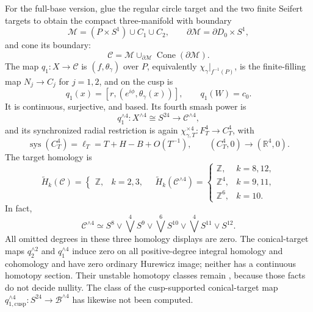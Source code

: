 \begin{enumerate}[leftmargin=1.8em,itemsep=.65em]
For the full-base version, glue the regular circle target and the two finite
Seifert targets to obtain the compact three-manifold with boundary
\[
 \mathcal M=(P\times S^1)\cup C_1\cup C_2,
 \qquad \partial\mathcal M=\partial D_0\times S^1,
\]
and cone its boundary:
\[
 \mathcal C=\mathcal M\cup_{\partial\mathcal M}
 \operatorname{Cone}(\partial\mathcal M).
\]
The map \(q_1:X\to\mathcal C\) is \((f,\theta_\gamma)\) over \(P\),
equivalently \(\chi_\gamma|_{f^{-1}(P)}\), is the
finite-filling map \(N_j\to C_j\) for \(j=1,2\), and on the cusp is
\[
 q_1(x)=[r,(e^{i\phi},\theta_\gamma(x))],\qquad q_1(W)=c_0.
\]
It is continuous, surjective, and based.  Its fourth smash power is
\[
 q_1^{\wedge4}:X^{\wedge4}\cong S^{24}\longrightarrow\mathcal C^{\wedge4},
\]
and its synchronized radial restriction is again
\(\chi_{\gamma,T}^{\times4}:F_T^4\to C_T^4\), with
\[
 \operatorname{sys}(C_T^4)=\ell_T=T+H-B+O(T^{-1}),
 \qquad (C_T^4,0)\longrightarrow(\mathbb R^4,0).
\]
The target homology is
\[
 \widetilde H_k(\mathcal C)=
 \begin{cases}\mathbb Z,&k=2,3,\end{cases}
\quad
 \widetilde H_k(\mathcal C^{\wedge4})=
 \begin{cases}
 \mathbb Z,&k=8,12,\\ \mathbb Z^4,&k=9,11,\\
 \mathbb Z^6,&k=10.
 \end{cases}
\]
In fact,
\[
 \mathcal C^{\wedge4}\simeq
 S^8\vee\bigvee^4S^9\vee\bigvee^6S^{10}
 \vee\bigvee^4S^{11}\vee S^{12}.
\]
All omitted degrees in these three homology displays are zero.
The conical-target maps \(q_2^{\wedge2}\) and \(q_1^{\wedge4}\) induce zero on
all positive-degree integral homology and cohomology and have zero ordinary
Hurewicz image; neither has a continuous homotopy section.  Their unstable
homotopy classes remain \Open, because those facts do not decide nullity.  The
class of the cusp-supported conical-target map
\(q_{1,\mathrm{cusp}}^{\wedge4}:S^{24}\to\mathcal B^{\wedge4}\) has likewise
not been computed.


\end{enumerate}
